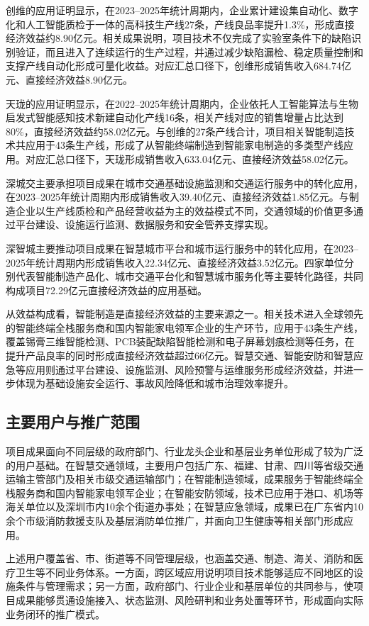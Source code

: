创维的应用证明显示，在2023--2025年统计周期内，企业累计建设集自动化、数字化和人工智能质检于一体的高科技生产线27条，产线良品率提升1.3\%，形成直接经济效益约8.90亿元。相关成果说明，项目技术不仅完成了实验室条件下的缺陷识别验证，而且进入了连续运行的生产过程，并通过减少缺陷漏检、稳定质量控制和支撑产线自动化形成可量化收益。对应汇总口径下，创维形成销售收入684.74亿元、直接经济效益8.90亿元。

天珑的应用证明显示，在2022--2025年统计周期内，企业依托人工智能算法与生物启发式智能感知技术新建自动化产线16条，相关产线对应的销售增量占比达到80\%，直接经济效益约58.02亿元。与创维的27条产线合计，项目相关智能制造技术共应用于43条生产线，形成了从智能终端制造到智能家电制造的多类型产线应用。对应汇总口径下，天珑形成销售收入633.04亿元、直接经济效益58.02亿元。

深城交主要承担项目成果在城市交通基础设施监测和交通运行服务中的转化应用，在2023--2025年统计周期内形成销售收入39.40亿元、直接经济效益1.85亿元。与制造企业以生产线质检和产品经营收益为主的效益模式不同，交通领域的价值更多通过平台建设、设施运行监测、数据服务和安全管养支撑实现。

深智城主要推动项目成果在智慧城市平台和城市运行服务中的转化应用，在2023--2025年统计周期内形成销售收入22.34亿元、直接经济效益3.52亿元。四家单位分别代表智能制造产品化、城市交通平台化和智慧城市服务化等主要转化路径，共同构成项目72.29亿元直接经济效益的应用基础。

从效益构成看，智能制造是直接经济效益的主要来源之一。相关技术进入全球领先的智能终端全栈服务商和国内智能家电领军企业的生产环节，应用于43条生产线，覆盖锡膏三维智能检测、PCB装配缺陷智能检测和电子屏幕划痕检测等任务，在提升产品良率的同时形成直接经济效益超过66亿元。智慧交通、智能安防和智慧应急等应用则通过平台建设、设施监测、风险预警与运维服务形成经济效益，并进一步体现为基础设施安全运行、事故风险降低和城市治理效率提升。

\subsection{主要用户与推广范围}

项目成果面向不同层级的政府部门、行业龙头企业和基层业务单位形成了较为广泛的用户基础。在智慧交通领域，主要用户包括广东、福建、甘肃、四川等省级交通运输主管部门及相关市级交通运输部门；在智能制造领域，成果服务于智能终端全栈服务商和国内智能家电领军企业；在智能安防领域，技术已应用于港口、机场等海关单位以及深圳市内10余个街道办事处；在智慧应急领域，成果已在广东省内10余个市级消防救援支队及基层消防单位推广，并面向卫生健康等相关部门形成应用。

上述用户覆盖省、市、街道等不同管理层级，也涵盖交通、制造、海关、消防和医疗卫生等不同业务体系。一方面，跨区域应用说明项目技术能够适应不同地区的设施条件与管理需求；另一方面，政府部门、行业企业和基层单位的共同参与，使项目成果能够贯通设施接入、状态监测、风险研判和业务处置等环节，形成面向实际业务闭环的推广模式。

